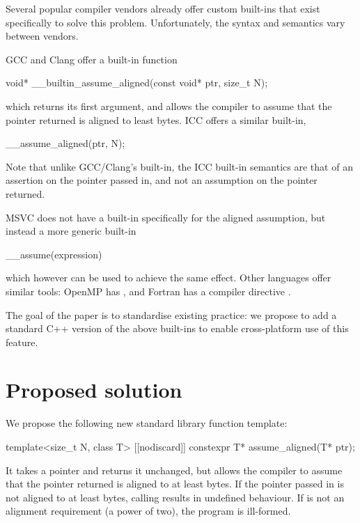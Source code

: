 Several popular compiler vendors already offer custom built-ins that exist specifically to solve this problem. Unfortunately, the syntax and semantics vary between vendors. 

GCC and Clang offer a built-in function 

\begin{codeblock}
void* __builtin_assume_aligned(const void* ptr, size_t N);
\end{codeblock}

which returns its first argument, and allows the compiler to assume that the pointer returned is aligned to least  bytes. ICC offers a similar built-in,


\begin{codeblock}
__assume_aligned(ptr, N);
\end{codeblock}

Note that unlike GCC/Clang's built-in, the ICC built-in semantics are that of an assertion on the pointer passed in, and not an assumption on the pointer returned. 

MSVC does not have a built-in specifically for the aligned assumption, but instead a more generic built-in

\begin{codeblock}
__assume(expression)
\end{codeblock}

which however can be used to achieve the same effect. Other languages offer similar tools: OpenMP has , and Fortran has a compiler directive .

The goal of the paper is to standardise existing practice: we propose to add a standard C++ version of the above built-ins to enable cross-platform use of this feature.

\section{Proposed solution}

We propose the following new standard library function template:

\begin{codeblock}
template<size_t N, class T> 
[[nodiscard]] constexpr T* assume_aligned(T* ptr);
\end{codeblock}

It takes a pointer and returns it unchanged, but allows the compiler to assume that the pointer returned is aligned to at least  bytes. If the pointer passed in is not aligned to at least  bytes, calling  results in undefined behaviour. If  is not an alignment requirement (a power of two), the program is ill-formed.

